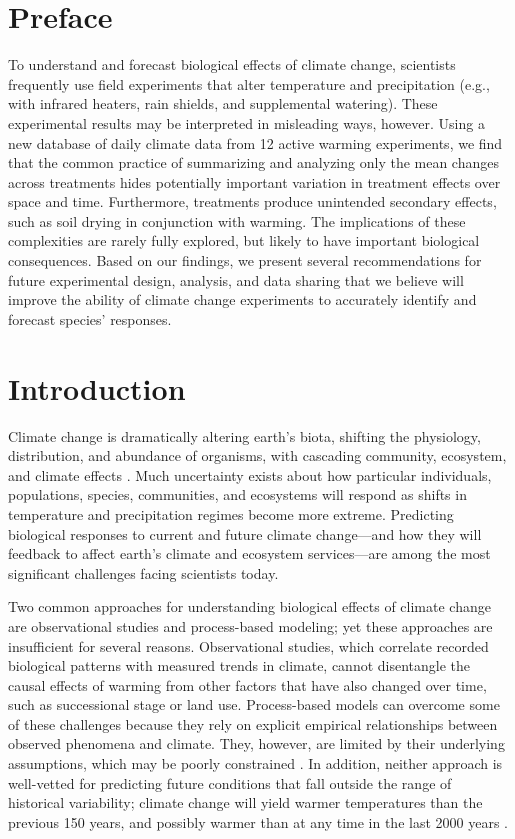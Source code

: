 \documentclass{article}
\begin{document}
\section* {Preface} 
\par To understand and forecast biological effects of climate change, scientists frequently use field experiments that alter temperature and precipitation (e.g., with infrared heaters, rain shields, and supplemental watering). These experimental results may be interpreted in misleading ways, however. Using a new database of daily climate data from 12 active warming experiments, we find that the common practice of summarizing and analyzing only the mean changes across treatments hides potentially important variation in treatment effects over space and time. Furthermore, treatments produce unintended secondary effects, such as soil drying in conjunction with warming. The implications of these complexities are rarely fully explored, but likely to have important biological consequences. Based on our findings, we present several recommendations for future experimental design, analysis, and data sharing that we believe will improve the ability of climate change experiments to accurately identify and forecast species' responses.
\section* {Introduction}
\par Climate change is dramatically altering earth's biota, shifting the physiology, distribution, and abundance of organisms, with cascading community, ecosystem, and climate effects \citep{shukla1982,cox2000,thomas2004,parmesan2006,field2007,sheldon2011,urban2012}. Much uncertainty exists about how particular individuals, populations, species, communities, and ecosystems will respond as shifts in temperature and precipitation regimes become more extreme. Predicting biological responses to current and future climate change---and how they will feedback to affect earth's climate and ecosystem services---are among the most significant challenges facing scientists today.

\par Two common approaches for understanding biological effects of climate change are observational studies and process-based modeling; yet these approaches are insufficient for several reasons. Observational studies, which correlate recorded biological patterns with measured trends in climate, cannot disentangle the causal effects of warming from other factors that have also changed over time, such as successional stage or land use. Process-based models can overcome some of these challenges because they rely on explicit empirical relationships between observed phenomena and climate. They, however, are limited by their underlying assumptions, which may be poorly constrained \citep [e.g.,][]{pearson2004,ibanez2006,swab2012,chuine2016}. In addition, neither approach is well-vetted for predicting future conditions that fall outside the range of historical variability; climate change will yield warmer temperatures than the previous 150 years, and possibly warmer than at any time in the last 2000 years \citep{ohlemuller2006,williams2007,williams2007b,ipcc2013}.  
\end{document}

